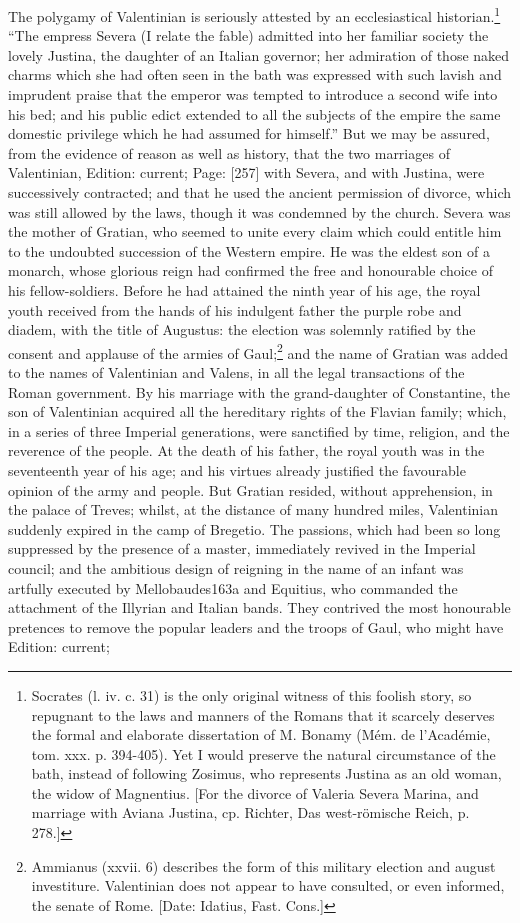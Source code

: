 The polygamy of Valentinian is seriously attested by an ecclesiastical historian.\footnote{Socrates (l. iv. c. 31) is the only original witness of this foolish story, so repugnant to the laws and manners of the Romans that it scarcely deserves the formal and elaborate dissertation of M. Bonamy (Mém. de l\texthebrew{}’Académie, tom. xxx. p. 394-405). Yet I would preserve the natural circumstance of the bath, instead of following Zosimus, who represents Justina as an old woman, the widow of Magnentius. [For the divorce of Valeria Severa Marina, and marriage with Aviana Justina, cp. Richter, Das west-römische Reich, p. 278.]} \texthebrew{“}The empress Severa (I relate the fable) admitted into her familiar society the lovely Justina, the daughter of an Italian governor; her admiration of those naked charms which she had often seen in the bath was expressed with such lavish and imprudent praise that the emperor was tempted to introduce a second wife into his bed; and his public edict extended to all the subjects of the empire the same domestic privilege which he had assumed for himself.\texthebrew{}” But we may be assured, from the evidence of reason as well as history, that the two marriages of Valentinian, Edition: current; Page: [257] with Severa, and with Justina, were successively contracted; and that he used the ancient permission of divorce, which was still allowed by the laws, though it was condemned by the church. Severa was the mother of Gratian, who seemed to unite every claim which could entitle him to the undoubted succession of the Western empire. He was the eldest son of a monarch, whose glorious reign had confirmed the free and honourable choice of his fellow-soldiers. Before he had attained the ninth year of his age, the royal youth received from the hands of his indulgent father the purple robe and diadem, with the title of Augustus: the election was solemnly ratified by the consent and applause of the armies of Gaul;\footnote{Ammianus (xxvii. 6) describes the form of this military election and august investiture. Valentinian does not appear to have consulted, or even informed, the senate of Rome. [Date: Idatius, Fast. Cons.]} and the name of Gratian was added to the names of Valentinian and Valens, in all the legal transactions of the Roman government. By his marriage with the grand-daughter of Constantine, the son of Valentinian acquired all the hereditary rights of the Flavian family; which, in a series of three Imperial generations, were sanctified by time, religion, and the reverence of the people. At the death of his father, the royal youth was in the seventeenth year of his age; and his virtues already justified the favourable opinion of the army and people. But Gratian resided, without apprehension, in the palace of Treves; whilst, at the distance of many hundred miles, Valentinian suddenly expired in the camp of Bregetio. The passions, which had been so long suppressed by the presence of a master, immediately revived in the Imperial council; and the ambitious design of reigning in the name of an infant was artfully executed by Mellobaudes163a and Equitius, who commanded the attachment of the Illyrian and Italian bands. They contrived the most honourable pretences to remove the popular leaders and the troops of Gaul, who might have Edition: current; 
